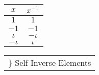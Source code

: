 
\begin{table}[h]
	\label{inverses_table}
	\begin{center}
		\begin{minipage}{.25\linewidth}
			\begin{flushright}
				\begin{tabular}{c|c}
					$x$ & $x ^{-1}$ \\ 
					\hline
					$1$ & $1$ \\
					$-1$ & $-1$ \\
					$\iota$ & $-\iota$ \\
					$-\iota$ & $\iota$
				\end{tabular}
			\end{flushright}
		\end{minipage}
		\begin{minipage}{.25\linewidth}
			\begin{flushleft}
				\vspace{-0.675cm}
				\begin{tabular}{c}
					{\Large\}} Self Inverse Elements
				\end{tabular}
			\end{flushleft}
		\end{minipage}
	\end{center}
\end{table}